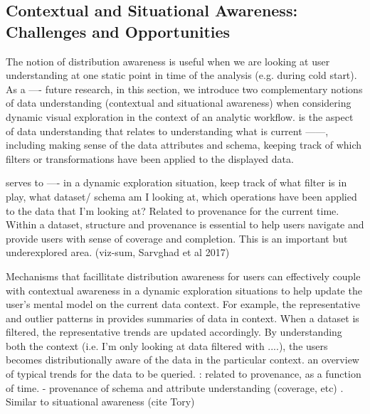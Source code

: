 
\subsection{Contextual and Situational Awareness: Challenges and Opportunities}
\par The notion of distribution awareness is useful when we are looking at user understanding at one static point in time of the analysis (e.g. during cold start). As a ---- future research, in this section, we introduce two complementary notions of data understanding (contextual and situational awareness) when considering dynamic visual exploration in the context of an analytic workflow.
 is the aspect of data understanding that relates to understanding what is  current ------, including making sense of the data attributes and schema, keeping track of which filters or transformations have been applied to the displayed data.


serves to ---- in a dynamic exploration situation, keep track of what filter is in play, what dataset/ schema am I looking at, which operations have been applied to the data that I'm looking at? Related to provenance for the current time. 
Within a dataset, structure and provenance is essential to help users navigate and provide users with sense of coverage and completion. This is an important but underexplored area. (viz-sum, Sarvghad et al 2017)
\par Mechanisms that facillitate distribution awareness for users can effectively couple with contextual awareness in a dynamic exploration situations to help update the user's mental model on the current data context. For example, the representative and outlier patterns in \zv provides summaries of data in context. When a dataset is filtered, the representative trends are updated accordingly. By understanding both the context (i.e. I'm only looking at data filtered with ....), the users becomes distributionally aware of the data in the particular context. 
an overview of typical trends for the data to be queried.
: 
related to provenance, as a function of time.
- provenance of schema and attribute understanding (coverage, etc) . Similar to situational awareness (cite Tory)

